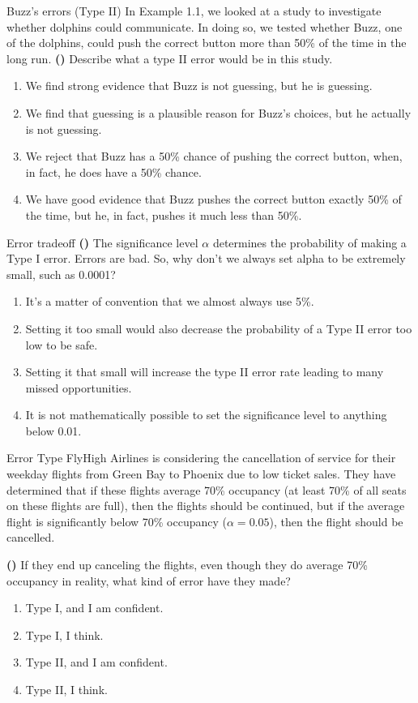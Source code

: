 \documentclass[13pt]{beamer}
\newcounter{count}
\newcommand{\question}{ \textbf{(\decimal{count})} \stepcounter{count}}
\begin{document}
\begin{frame}{Buzz's errors (Type II)}
In Example 1.1, we looked at a study to investigate whether dolphins could communicate. In doing so, we tested whether Buzz, one of the dolphins, could push the correct button more
than 50\% of the time in the long run. \question Describe what a type II error would be in this study.
\begin{enumerate}[A]
	\item We find strong evidence that Buzz is not guessing, but he is guessing.
    \item We find that guessing is a plausible reason for Buzz's choices, but he actually is not guessing.
    \item We reject that Buzz has a 50\% chance of pushing the correct button, when, in fact, he does have a 50\% chance.
    \item We have good evidence that Buzz pushes the correct button exactly 50\% of the time, but he, in fact, pushes it much less than 50\%.
\end{enumerate}
\end{frame}

\begin{frame}{Error tradeoff}
\question The significance level $\alpha$ determines the probability of making a Type I error. Errors are bad.
So, why don't we always set alpha to be extremely small, such as 0.0001?
\begin{enumerate}[A]
	\item It's a matter of convention that we almost always use 5\%.
    \item Setting it too small would also decrease the probability of a Type II error too low to be safe.
    \item Setting it that small will increase the type II error rate leading to many missed opportunities.
    \item It is not mathematically possible to set the significance level to anything below 0.01.
\end{enumerate}
\end{frame}

\begin{frame}{Error Type}
FlyHigh Airlines is considering the cancellation of service for their weekday flights from Green Bay to Phoenix due to low ticket sales. They have determined that if these flights average 70\% occupancy (at least 70\% of all seats on these flights are full), then the flights should be continued, but if the average flight is significantly below 70\% occupancy ($\alpha=0.05$), then the flight should be cancelled.\smallskip

\question If they end up canceling the flights, even though they do average 70\% occupancy in reality, what kind of error have they made?
\begin{enumerate}[A]
	\item Type I, and I am confident.
    \item Type I, I think.
    \item Type II, and I am confident.
    \item Type II, I think.
\end{enumerate}
\end{frame}
\end{document}
